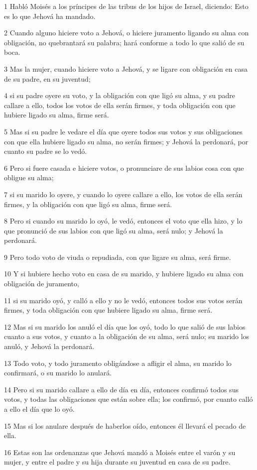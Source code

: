 \par 1 Habló Moisés a los príncipes de las tribus de los hijos de Israel, diciendo: Esto es lo que Jehová ha mandado.
\par 2 Cuando alguno hiciere voto a Jehová, o hiciere juramento ligando su alma con obligación, no quebrantará su palabra; hará conforme a todo lo que salió de su boca.
\par 3 Mas la mujer, cuando hiciere voto a Jehová, y se ligare con obligación en casa de su padre, en su juventud;
\par 4 si su padre oyere su voto, y la obligación con que ligó su alma, y su padre callare a ello, todos los votos de ella serán firmes, y toda obligación con que hubiere ligado su alma, firme será.
\par 5 Mas si su padre le vedare el día que oyere todos sus votos y sus obligaciones con que ella hubiere ligado su alma, no serán firmes; y Jehová la perdonará, por cuanto su padre se lo vedó.
\par 6 Pero si fuere casada e hiciere votos, o pronunciare de sus labios cosa con que obligue su alma;
\par 7 si su marido lo oyere, y cuando lo oyere callare a ello, los votos de ella serán firmes, y la obligación con que ligó su alma, firme será.
\par 8 Pero si cuando su marido lo oyó, le vedó, entonces el voto que ella hizo, y lo que pronunció de sus labios con que ligó su alma, será nulo; y Jehová la perdonará.
\par 9 Pero todo voto de viuda o repudiada, con que ligare su alma, será firme.
\par 10 Y si hubiere hecho voto en casa de su marido, y hubiere ligado su alma con obligación de juramento,
\par 11 si su marido oyó, y calló a ello y no le vedó, entonces todos sus votos serán firmes, y toda obligación con que hubiere ligado su alma, firme será.
\par 12 Mas si su marido los anuló el día que los oyó, todo lo que salió de sus labios cuanto a sus votos, y cuanto a la obligación de su alma, será nulo; su marido los anuló, y Jehová la perdonará.
\par 13 Todo voto, y todo juramento obligándose a afligir el alma, su marido lo confirmará, o su marido lo anulará.
\par 14 Pero si su marido callare a ello de día en día, entonces confirmó todos sus votos, y todas las obligaciones que están sobre ella; los confirmó, por cuanto calló a ello el día que lo oyó.
\par 15 Mas si los anulare después de haberlos oído, entonces él llevará el pecado de ella.
\par 16 Estas son las ordenanzas que Jehová mandó a Moisés entre el varón y su mujer, y entre el padre y su hija durante su juventud en casa de su padre.

